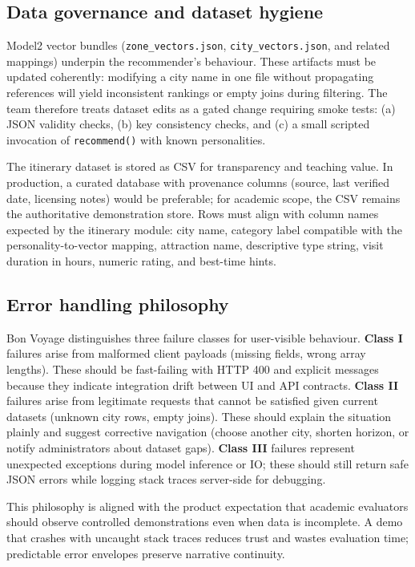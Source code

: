 \documentclass[12pt,oneside,openany]{report}
\begin{document}
\subsection{Data governance and dataset hygiene}
Model2 vector bundles (\texttt{zone\_vectors.json}, \texttt{city\_vectors.json}, and related mappings) underpin the recommender's behaviour. These artifacts must be updated coherently: modifying a city name in one file without propagating references will yield inconsistent rankings or empty joins during filtering. The team therefore treats dataset edits as a gated change requiring smoke tests: (a) JSON validity checks, (b) key consistency checks, and (c) a small scripted invocation of \texttt{recommend()} with known personalities.

The itinerary dataset is stored as CSV for transparency and teaching value. In production, a curated database with provenance columns (source, last verified date, licensing notes) would be preferable; for academic scope, the CSV remains the authoritative demonstration store. Rows must align with column names expected by the itinerary module: city name, category label compatible with the personality-to-vector mapping, attraction name, descriptive type string, visit duration in hours, numeric rating, and best-time hints.

\subsection{Error handling philosophy}
Bon Voyage distinguishes three failure classes for user-visible behaviour. \textbf{Class I} failures arise from malformed client payloads (missing fields, wrong array lengths). These should be fast-failing with HTTP 400 and explicit messages because they indicate integration drift between UI and API contracts. \textbf{Class II} failures arise from legitimate requests that cannot be satisfied given current datasets (unknown city rows, empty joins). These should explain the situation plainly and suggest corrective navigation (choose another city, shorten horizon, or notify administrators about dataset gaps). \textbf{Class III} failures represent unexpected exceptions during model inference or IO; these should still return safe JSON errors while logging stack traces server-side for debugging.

This philosophy is aligned with the product expectation that academic evaluators should observe controlled demonstrations even when data is incomplete. A demo that crashes with uncaught stack traces reduces trust and wastes evaluation time; predictable error envelopes preserve narrative continuity.
\end{document}

